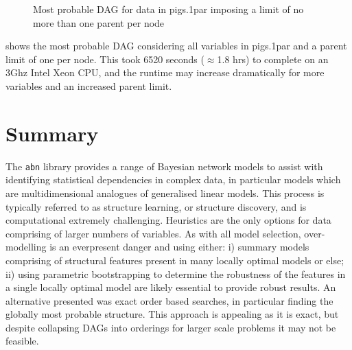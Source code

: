 \documentclass[nojss]{jss}
\begin{document}
\begin{figure}[htb]
\caption{Most probable DAG for data in pigs.1par imposing a limit of no more than one parent per node} \label{fig8}
\end{figure}
shows the most probable DAG considering all variables in pigs.1par and a parent limit of one per node. This took 6520 seconds ($\approx$1.8 hrs) to complete on an 3Ghz Intel Xeon CPU, and the runtime may increase dramatically for more variables and an increased parent limit.
\clearpage
\section{Summary}
The {\tt abn} library provides a range of Bayesian network models to assist with identifying statistical dependencies in complex data, in particular models which are multidimensional analogues of generalised linear models. This process is typically referred to as structure learning, or structure discovery, and is computational extremely challenging. Heuristics are the only options for data comprising of larger numbers of variables. As with all model selection, over-modelling is an everpresent danger and using either: i) summary models comprising of structural features present in many locally optimal models or else; ii) using parametric bootstrapping to determine the robustness of the features in a single locally optimal model are likely essential to provide robust results. An alternative presented was exact order based searches, in particular finding the globally most probable structure. This approach is appealing as it is exact, but despite collapsing DAGs into orderings for larger scale problems it may not be feasible.   

\newpage

\end{document}
